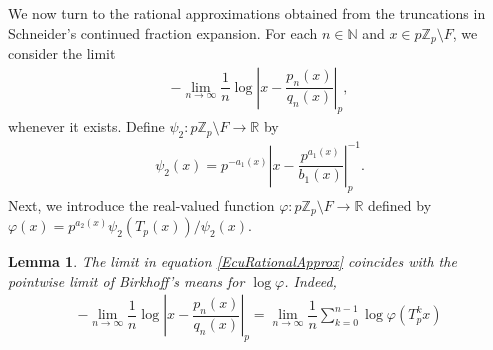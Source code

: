 \documentclass[11pt]{amsart}
\newtheorem{lemma}[theorem]{Lemma}
\theoremstyle{remark}
\numberwithin{equation}{section}
\newcommand{\N}{\mathbb{N}}
\newcommand{\R}{\mathbb{R}}
\newcommand{\Z}{\mathbb{Z}}
\newcommand{\Zp}{\mathbb{Z}_p}
\begin{document}
 We now turn to the rational approximations obtained from the truncations in Schneider's continued fraction expansion. For each $n\in \N$ and $x\in p\Zp\setminus F$, we consider the limit
\begin{align}\label{EcuRationalApprox}
    -\lim_{n\to \infty}\dfrac{1}{n}\log \left|x-\dfrac{p_{n}(x)}{q_{n}(x)}\right|_{p},
\end{align}whenever it exists. Define $\psi_{2}:p\Z_{p}\setminus F\rightarrow \R$ by 
\begin{align*}
    \psi_{2}(x)=p^{-a_{1}(x)}\left|x-\dfrac{p^{a_{1}(x)}}{b_{1}(x)}\right|^{-1}_{p}.
\end{align*}Next, we introduce the real-valued function $\varphi:p\Z_{p}\setminus F\to \R$ defined by $\varphi(x)=p^{a_{2}(x)}\psi_{2}(T_{p}(x))/\psi_{2}(x)$.
\begin{lemma}\label{Lemma1}
    The limit in equation \eqref{EcuRationalApprox} coincides with the pointwise limit of Birkhoff's means for $\log \varphi$. Indeed,
    \begin{align*}
        -\lim_{n\to \infty}\dfrac{1}{n}\log \left|x-\dfrac{p_{n}(x)}{q_{n}(x)}\right|_{p}=\lim_{n\rightarrow \infty}\dfrac{1}{n}\sum^{n-1}_{k=0}\log\varphi\left(T_p^kx\right)
    \end{align*}
\end{lemma}
\end{document}
